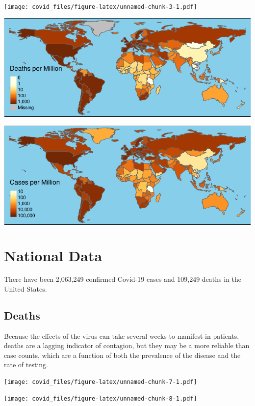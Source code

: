 \documentclass[]{article}
\begin{document}
\newpage

\texttt{[image: covid\_files/figure-latex/unnamed-chunk-3-1.pdf]}

\includegraphics{covid_files/figure-latex/unnamed-chunk-4-1.pdf}

\includegraphics{covid_files/figure-latex/unnamed-chunk-5-1.pdf}

\newpage

\hypertarget{national-data}{%
\section{National Data}\label{national-data}}

There have been 2,063,249 confirmed Covid-19 cases and 109,249 deaths in
the United States.

\hypertarget{deaths}{%
\subsection{Deaths}\label{deaths}}

Because the effects of the virus can take several weeks to manifest in
patients, deaths are a lagging indicator of contagion, but they may be a
more reliable than case counts, which are a function of both the
prevalence of the disease and the rate of testing.

\texttt{[image: covid\_files/figure-latex/unnamed-chunk-7-1.pdf]}

\texttt{[image: covid\_files/figure-latex/unnamed-chunk-8-1.pdf]}
\end{document}
